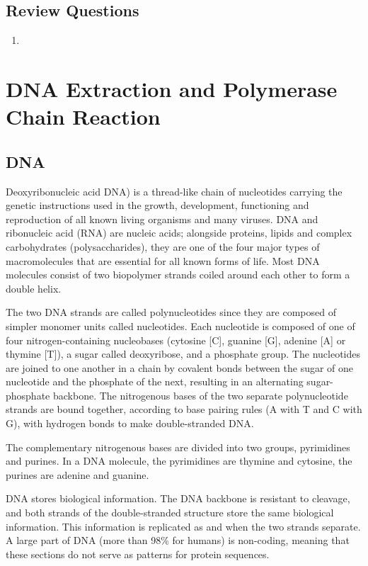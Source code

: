 \documentclass[]{book}
\theoremstyle{definition}
\theoremstyle{definition}
\theoremstyle{definition}
\theoremstyle{remark}
\begin{document}
\section{Review Questions}\label{review-questions-3}

\begin{enumerate}
\def\labelenumi{\arabic{enumi}.}
\item
\end{enumerate}

\chapter{DNA Extraction and Polymerase Chain
Reaction}\label{dna-extraction-and-polymerase-chain-reaction}

\section{DNA}\label{dna}

Deoxyribonucleic acid DNA) is a thread-like chain of nucleotides
carrying the genetic instructions used in the growth, development,
functioning and reproduction of all known living organisms and many
viruses. DNA and ribonucleic acid (RNA) are nucleic acids; alongside
proteins, lipids and complex carbohydrates (polysaccharides), they are
one of the four major types of macromolecules that are essential for all
known forms of life. Most DNA molecules consist of two biopolymer
strands coiled around each other to form a double helix.

The two DNA strands are called polynucleotides since they are composed
of simpler monomer units called nucleotides. Each nucleotide is composed
of one of four nitrogen-containing nucleobases (cytosine {[}C{]},
guanine {[}G{]}, adenine {[}A{]} or thymine {[}T{]}), a sugar called
deoxyribose, and a phosphate group. The nucleotides are joined to one
another in a chain by covalent bonds between the sugar of one nucleotide
and the phosphate of the next, resulting in an alternating
sugar-phosphate backbone. The nitrogenous bases of the two separate
polynucleotide strands are bound together, according to base pairing
rules (A with T and C with G), with hydrogen bonds to make
double-stranded DNA.

The complementary nitrogenous bases are divided into two groups,
pyrimidines and purines. In a DNA molecule, the pyrimidines are thymine
and cytosine, the purines are adenine and guanine.

DNA stores biological information. The DNA backbone is resistant to
cleavage, and both strands of the double-stranded structure store the
same biological information. This information is replicated as and when
the two strands separate. A large part of DNA (more than 98\% for
humans) is non-coding, meaning that these sections do not serve as
patterns for protein sequences.
\end{document}
